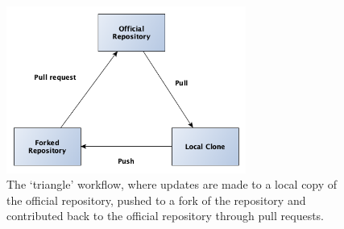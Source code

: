 \documentclass[11pt,a4paper]{ivoa}
\begin{document}
\begin{figure}[th]
  \begin{center}
    \includegraphics[width=0.7\textwidth]{triangle_workflow.png}
  \end{center}
  \caption{The `triangle' workflow, where updates are made to a local
      copy of the official repository, pushed to a fork of the
      repository and contributed back to the official repository
      through pull requests.}
  \label{fig:triangleWorkflow}
\end{figure}
\end{document}
